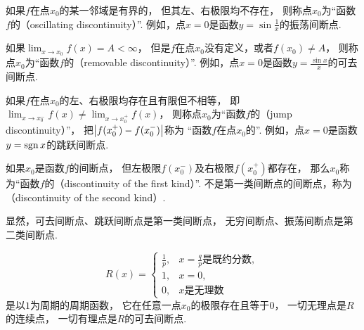 如果\(f\)在点\(x_0\)的某一邻域是有界的，
但其左、右极限均不存在，
则称点\(x_0\)为“函数\(f\)的（oscillating discontinuity）”.
例如，点\(x=0\)是函数\(y=\sin\frac{1}{x}\)的振荡间断点.

如果\(\lim_{x \to x_0} f(x) = A < \infty\)，
但是\(f\)在点\(x_0\)没有定义，或者\(f(x_0) \neq A\)，
则称点\(x_0\)为“函数\(f\)的（removable discontinuity）”.
例如，点\(x=0\)是函数\(y=\frac{\sin x}{x}\)的可去间断点.

如果\(f\)在点\(x_0\)的左、右极限均存在且有限但不相等，
即\(\lim_{x \to x_0^-} f(x) \neq \lim_{x \to x_0^+} f(x)\)，
则称点\(x_0\)为“函数\(f\)的（jump discontinuity）”，
把\(\abs{f(x_0^+)-f(x_0^-)}\)称为
“函数\(f\)在点\(x_0\)的”.
例如，点\(x=0\)是函数\(y=\operatorname{sgn} x\)的跳跃间断点.

如果\(x_0\)是函数\(f\)的间断点，
但左极限\(f(x_0^-)\)及右极限\(f(x_0^+)\)都存在，
那么\(x_0\)称为“函数\(f\)的（discontinuity of the first kind）”.
不是第一类间断点的间断点，称为（discontinuity of the second kind）.

显然，可去间断点、跳跃间断点是第一类间断点，
无穷间断点、振荡间断点是第二类间断点.

\begin{example}
\begin{equation*}
	R(x) = \left\{ \begin{array}{cl}
		\frac1p, & \text{$x=\frac{q}{p}$是既约分数}, \\
		1, & x=0, \\
		0, & \text{$x$是无理数}
	\end{array} \right.
\end{equation*}是以\(1\)为周期的周期函数，
它在任意一点\(x_0\)的极限存在且等于\(0\)，
一切无理点是\(R\)的连续点，
一切有理点是\(R\)的可去间断点.
\end{example}

